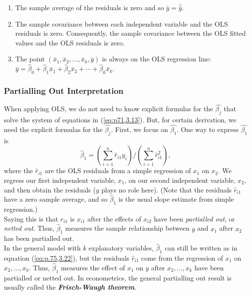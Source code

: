 \documentclass[a4paper, 10pt]{article}
\theoremstyle{definition}	%
\begin{document}
\begin{enumerate}
    \item The sample average of the residuals is zero and so $\bar{y} = \bar{\hat{y}}$.
    \item The sample covariance between each independent variable and the OLS residuals is zero. Consequently, the sample covariance between the OLS fitted values and the OLS residuals is zero.
    \item The point $\left( \bar{x}_1, \bar{x}_2, \dots, \bar{x}_k, \bar{y} \right)$ is always on the OLS regression line: $\bar{y} = \hat{\beta}_0 + \hat{\beta}_1 \bar{x}_1 + \hat{\beta}_2 \bar{x}_2 + \cdots + \hat{\beta}_k \bar{x}_k.$
\end{enumerate}

\subsubsection{Partialling Out Interpretation}
When applying OLS, we do not need to know explicit formulas for the $\hat{\beta_j}$ that solve the system of equations in (\ref{eq:p71,3.13}). But, for certain derivation, we need the explicit formulas for the $\hat{\beta_j}$. First, we focus on $\hat{\beta_1}$. One way to express $\hat{\beta_1}$ is
\begin{equation}
    \hat{\beta}_1 = \left( \sum_{i=1}^{n} \hat{r}_{i1} y_i \right) \bigg/ \left( \sum_{i=1}^{n} \hat{r}_{i1}^2 \right), \label{eq:p.75,3.22}
\end{equation}
where the $\hat{r}_{i1}$ are the OLS residuals from a simple regression of $x_1$ on $x_2$. We regress our first independent variable, $x_1$, on our second independent variable, $x_2$, and then obtain the residuals ($y$ plays no role here). (Note that the residuals $\hat{r}_{i1}$ have a zero sample average, and so $\hat{\beta}_1$ is the usual slope estimate from simple regression.)\\
Saying this is that $\hat{r}_{i1}$ is $x_{i1}$ after the effects of $x_{i2}$ have been \textit{partialled out}, or \textit{netted out}. Thus, $\hat{\beta}_1$ measures the sample relationship between $y$ and $x_1$ after $x_2$ has been partialled out.\\
In the general model with $k$ explanatory variables, $\hat{\beta}_1$ can still be written as in equation (\ref{eq:p.75,3.22}), but the residuals $\hat{r}_{i1}$ come from the regression of $x_1$ on $x_2, \ldots, x_k$. Thus, $\hat{\beta}_1$ measures the effect of $x_1$ on $y$ after $x_2, \ldots, x_k$ have been partialled or netted out. In econometrics, the general partialling out result is usually called the \textbf{\textit{Frisch-Waugh theorem}}.
\end{document}
